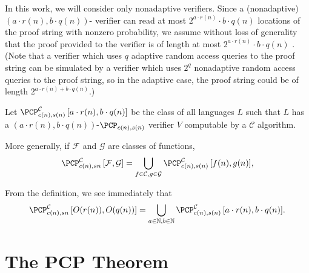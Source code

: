 \documentclass[]{article}
\newcommand{\PCPcs}[5]{\PCP^{#1}_{#2, #3}\left[#4, #5\right]}
\begin{document}
In this work, we will consider only nonadaptive \PCP{} verifiers.
Since a (nonadaptive) $(a \cdot r(n), b \cdot q(n))$-\PCP{} verifier can read at most $2^{a \cdot r(n)} \cdot b \cdot q(n)$ locations of the proof string with nonzero probability, we assume without loss of generality that the proof provided to the verifier is of length at most $2^{a \cdot r(n)} \cdot b \cdot q(n)$ \cite[Remark~11.6]{ab09}.
(Note that a verifier which uses $q$ adaptive random access queries to the proof string can be simulated by a verifier which uses $2^q$ nonadaptive random access queries to the proof string, so in the adaptive case, the proof string could be of length $2^{a \cdot r(n) + b \cdot q(n)}$.)

\begin{definition}
  Let $\PCPcs{\mathcal{C}}{c(n)}{s(n)}{a \cdot r(n)}{b \cdot q(n)}$ be the class of all languages $L$ such that $L$ has a $(a \cdot r(n), b \cdot q(n))$-$\PCP_{c(n), s(n)}$ verifier $V$ computable by a $\mathcal{C}$ algorithm.

  More generally, if $\mathcal{F}$ and $\mathcal{G}$ are classes of functions,
  \begin{equation*}
    \PCPcs{\mathcal{C}}{c(n)}{s{n}}{\mathcal{F}}{\mathcal{G}} = \bigcup_{f \in \mathcal{C}, g \in \mathcal{G}}{\PCPcs{\mathcal{C}}{c(n)}{s(n)}{f(n)}{g(n)}},
    \end{equation*}
\end{definition}

From the definition, we see immediately that
\begin{equation*}
  \PCPcs{\mathcal{C}}{c(n)}{s{n}}{O(r(n))}{O(q(n))} = \bigcup_{a \in \mathbb{N}, b \in \mathbb{N}}{\PCPcs{\mathcal{C}}{c(n)}{s(n)}{a \cdot r(n)}{b \cdot q(n)}}.
\end{equation*}

\section{The PCP Theorem}
\end{document}
